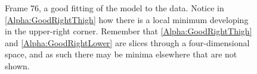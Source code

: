 \begin{figure}[p]
	\qquad
	
	\caption{Frame 76, a good fitting of the model to the data.
		Notice in \ref{Alpha:GoodRightThigh} how there is a local minimum developing in the upper-right corner.
		Remember that \ref{Alpha:GoodRightThigh} and \ref{Alpha:GoodRightLower} are slices through a four-dimensional space,
		and as such there may be minima elsewhere that are not shown.}
	\label{AlphaGood}
\end{figure}

